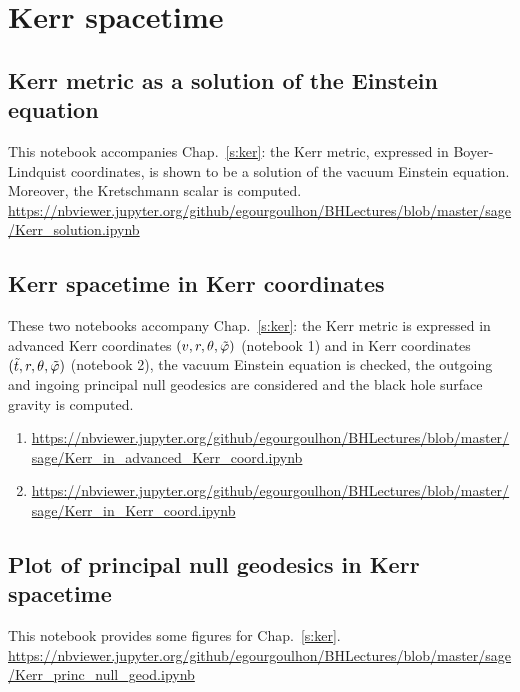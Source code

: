 
\section{Kerr spacetime}

\subsection{Kerr metric as a solution of the Einstein equation} \label{s:sam:Kerr_solution}

This notebook accompanies Chap.~\ref{s:ker}: the Kerr metric, expressed in Boyer-Lindquist
coordinates, is shown to be a solution of the vacuum Einstein equation. Moreover, the Kretschmann scalar is computed.\\[1ex]
{\footnotesize
\url{https://nbviewer.jupyter.org/github/egourgoulhon/BHLectures/blob/master/sage/Kerr_solution.ipynb}
}

\subsection{Kerr spacetime in Kerr coordinates} \label{s:sam:Kerr_Kerr_coord}

These two notebooks accompany Chap.~\ref{s:ker}: the Kerr metric is expressed in advanced Kerr coordinates
$(v,r,\theta,{\tilde\varphi})$ (notebook 1) and in Kerr coordinates $({\tilde t},r,\theta,{\tilde\varphi})$ (notebook 2),
the vacuum Einstein equation is checked, the outgoing and ingoing principal null geodesics are considered and the black hole surface gravity is computed.
\begin{enumerate}
\item
{\footnotesize
\url{https://nbviewer.jupyter.org/github/egourgoulhon/BHLectures/blob/master/sage/Kerr_in_advanced_Kerr_coord.ipynb}
}
\item
{\footnotesize
\url{https://nbviewer.jupyter.org/github/egourgoulhon/BHLectures/blob/master/sage/Kerr_in_Kerr_coord.ipynb}
}
\end{enumerate}


\subsection{Plot of principal null geodesics in Kerr spacetime} \label{s:sam:Kerr_princ_null_geod}

This notebook provides some figures for Chap.~\ref{s:ker}.\\[1ex]
{\footnotesize
\url{https://nbviewer.jupyter.org/github/egourgoulhon/BHLectures/blob/master/sage/Kerr_princ_null_geod.ipynb}
}


